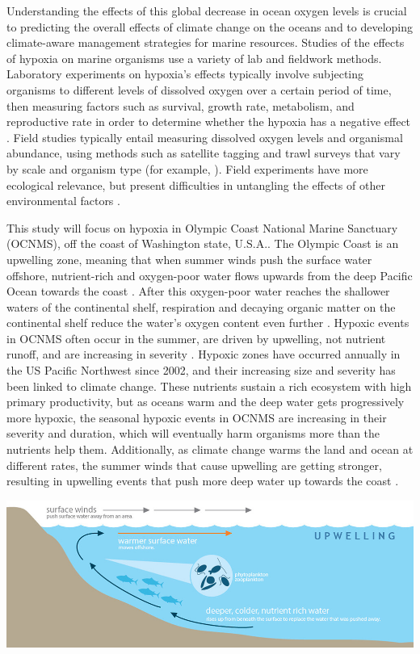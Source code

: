 \documentclass[12pt,twoside]{reedthesis}
\begin{document}
Understanding the effects of this global decrease in ocean oxygen levels is crucial to predicting the overall effects of climate change on the oceans and to developing climate-aware management strategies for marine resources. Studies of the effects of hypoxia on marine organisms use a variety of lab and fieldwork methods. Laboratory experiments on hypoxia's effects typically involve subjecting organisms to different levels of dissolved oxygen over a certain period of time, then measuring factors such as survival, growth rate, metabolism, and reproductive rate in order to determine whether the hypoxia has a negative effect \autocite{Steckbauer2020}. Field studies typically entail measuring dissolved oxygen levels and organismal abundance, using methods such as satellite tagging and trawl surveys that vary by scale and organism type (for example, \autocite{Keister2020}). Field experiments have more ecological relevance, but present difficulties in untangling the effects of other environmental factors \autocite{Borges2022, Boyd2018}. 

This study will focus on hypoxia in Olympic Coast National Marine Sanctuary (OCNMS), off the coast of Washington state, U.S.A.. The Olympic Coast is an upwelling zone, meaning that when summer winds push the surface water offshore, nutrient-rich and oxygen-poor water flows upwards from the deep Pacific Ocean towards the coast \autocite{OceanographyOlympicCoast, Hickey2003}. After this oxygen-poor water reaches the shallower waters of the continental shelf, respiration and decaying organic matter on the continental shelf reduce the water's oxygen content even further \autocite{Pierce2012}. Hypoxic events in OCNMS often occur in the summer, are driven by upwelling, not nutrient runoff, and are increasing in severity \autocite{Barth2024}. Hypoxic zones have occurred annually in the US Pacific Northwest since 2002, and their increasing size and severity has been linked to climate change. These nutrients sustain a rich ecosystem with high primary productivity, but as oceans warm and the deep water gets progressively more hypoxic, the seasonal hypoxic events in OCNMS are increasing in their severity and duration, which will eventually harm organisms more than the nutrients help them. Additionally, as climate change warms the land and ocean at different rates, the summer winds that cause upwelling are getting stronger, resulting in upwelling events that push more deep water up towards the coast \autocite{Barth2024}. 

\includegraphics[scale=0.4]{Fig_NOAA_Upwelling}
\end{document}
